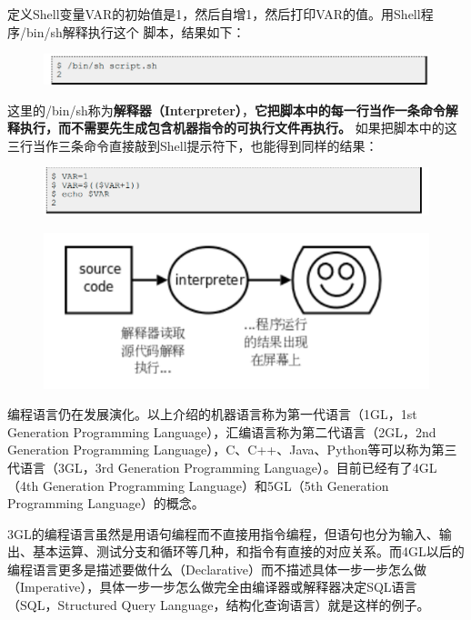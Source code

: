 \documentclass[12pt]{book}
\begin{document}
定义Shell变量VAR的初始值是1，然后自增1，然后打印VAR的值。用Shell程序/bin/sh解释执行这个
脚本，结果如下：

\begin{figure}[H]
\centering
\includegraphics[scale=0.5]{image//C语言入门//程序的基本概念//4.png}
\end{figure}

这里的/bin/sh称为\textbf{解释器（Interpreter）}，\textbf{它把脚本中的每一行当作一条命令解释执行，而不需要先生成包含机器指令的可执行文件再执行。}
如果把脚本中的这三行当作三条命令直接敲到Shell提示符下，也能得到同样的结果：

\begin{figure}[H]
\centering
\includegraphics[scale=0.7]{image//C语言入门//程序的基本概念//5.png}
\end{figure}

\begin{figure}[H]
\centering
\includegraphics[scale=0.7]{image//C语言入门//程序的基本概念//6.png}
\end{figure}

编程语言仍在发展演化。以上介绍的机器语言称为第一代语言（1GL，1st Generation Programming Language），汇编语言称为第二代语言（2GL，2nd Generation Programming Language），C、C++、Java、Python等可以称为第三代语言（3GL，3rd Generation Programming Language）。目前已经有了4GL（4th  Generation Programming Language）和5GL（5th Generation Programming Language）的概念。

3GL的编程语言虽然是用语句编程而不直接用指令编程，但语句也分为输入、输出、基本运算、测试分支和循环等几种，和指令有直接的对应关系。而4GL以后的编程语言更多是描述要做什么（Declarative）而不描述具体一步一步怎么做（Imperative），具体一步一步怎么做完全由编译器或解释器决定SQL语言
（SQL，Structured Query Language，结构化查询语言）就是这样的例子。
\end{document}
